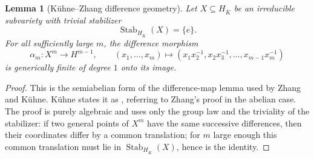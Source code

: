 \documentclass[10pt,a4paper]{amsart}
\theoremstyle{plain}
\newtheorem{lemma}[theorem]{Lemma}
\theoremstyle{plain}
\numberwithin{equation}{section}
\begin{document}
\begin{lemma}[K\"uhne--Zhang difference geometry]
	\label{lem:kuhne-difference-geometry}
	Let \(X\subseteq H_{\overline K}\) be an irreducible subvariety with trivial
	stabilizer
	\[
	\operatorname{Stab}_{H_{\overline K}}(X)=\{e\}.
	\]
	For all sufficiently large \(m\), the difference morphism
	\[
	\alpha_m:X^m\longrightarrow H^{m-1},\qquad
	(x_1,\ldots,x_m)\longmapsto
	(x_1x_2^{-1},x_2x_3^{-1},\ldots,x_{m-1}x_m^{-1})
	\]
	is generically finite of degree \(1\) onto its image.
\end{lemma}

\begin{proof}
	This is the semiabelian form of the difference-map lemma used by Zhang and
	K\"uhne.  K\"uhne states it as \cite[Lemma~6.2]{Ku1}, referring to
	Zhang's proof in the abelian case.  The proof is purely algebraic and uses only
	the group law and the triviality of the stabilizer: if two general points of
	\(X^m\) have the same successive differences, then their coordinates differ by
	a common translation; for \(m\) large enough this common translation must lie
	in \(\operatorname{Stab}_{H_{\overline K}}(X)\), hence is the identity.
\end{proof}
\end{document}
